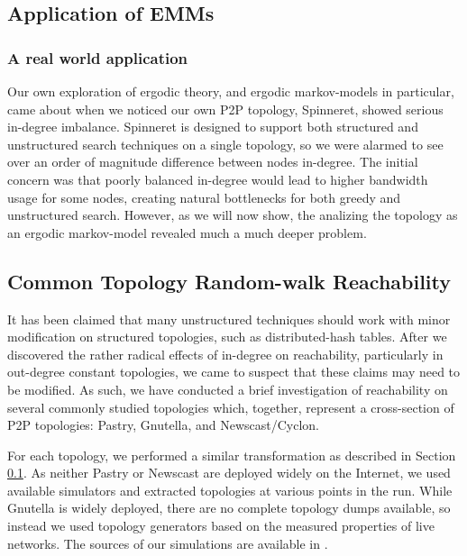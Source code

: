 \documentclass[a4paper,12pt]{article}
\begin{document}
\subsection{Application of EMMs}
\label{sec:ergodic-application}

\subsubsection{A real world application}

Our own exploration of ergodic theory, and ergodic markov-models in particular,
came about when we noticed our own P2P topology, Spinneret, showed serious
in-degree imbalance.  Spinneret is designed to support both structured and
unstructured search techniques on a single topology, so we were alarmed to see
over an order of magnitude difference between nodes in-degree.  The initial
concern was that poorly balanced in-degree would lead to higher bandwidth usage
for some nodes, creating natural bottlenecks for both greedy and unstructured
search.  However, as we will now show, the analizing the topology as an ergodic
markov-model revealed much a much deeper problem.

\subsection{Common Topology Random-walk Reachability}

It has been claimed that many unstructured techniques should work with minor
modification on structured topologies, such as distributed-hash tables.  After
we discovered the rather radical effects of in-degree on reachability,
particularly in out-degree constant topologies, we came to suspect that these
claims may need to be modified.  As such, we have conducted a brief
investigation of reachability on several commonly studied topologies which,
together, represent a cross-section of P2P topologies: Pastry, Gnutella, and
Newscast/Cyclon.

For each topology, we performed a similar transformation as described in
Section \ref{sec:ergodic-application}.  As neither Pastry or Newscast are
deployed widely on the Internet, we used available simulators and extracted
topologies at various points in the run.  While Gnutella is widely deployed,
there are no complete topology dumps available, so instead we used topology
generators based on the measured properties of live networks.  The sources of
our simulations are available in \cite{1,2,3}.  %
\end{document}
